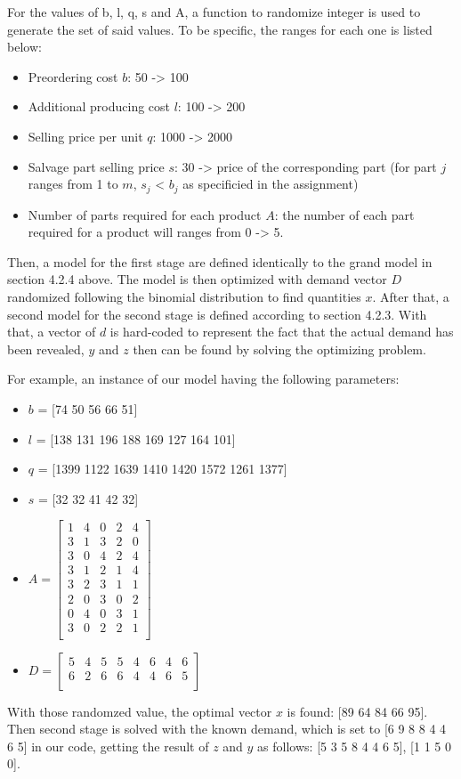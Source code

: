 		\qquad For the values of b, l, q, s and A, a function to randomize integer is used to generate the set of said values. To be specific, the ranges for each one is listed below:

		\begin{itemize}
			\item Preordering cost $b$: 50 -> 100
			\item Additional producing cost $l$: 100 -> 200
			\item Selling price per unit $q$: 1000 -> 2000
			\item Salvage part selling price $s$: 30 -> price of the corresponding part (for part $j$ ranges from 1 to $m$, $s_j$ < $b_j$ as specificied in the assignment)
			\item Number of parts required for each product $A$: the number of each part required for a product will ranges from 0 -> 5.
		\end{itemize}

		\qquad Then, a model for the first stage are defined identically to the grand model in section 4.2.4 above. The model is then optimized with demand vector $D$ randomized following the binomial distribution to find quantities $x$. After that, a second model for the second stage is defined according to section 4.2.3. With that, a vector of $d$ is hard-coded to represent the fact that the actual demand has been revealed, $y$ and $z$ then can be found by solving the optimizing problem.

		\qquad For example, an instance of our model having the following parameters:

		\begin{itemize}
			\item $b$ = [74 50 56 66 51]
			\item $l$ = [138 131 196 188 169 127 164 101]
			\item $q$ = [1399 1122 1639 1410 1420 1572 1261 1377]
			\item $s$ = [32 32 41 42 32]
			\item $A = 	\begin{bmatrix}
							1 & 4 & 0 & 2 & 4 \\
							3 & 1 & 3 & 2 & 0 \\
							3 & 0 & 4 & 2 & 4 \\
							3 & 1 & 2 & 1 & 4 \\
							3 & 2 & 3 & 1 & 1 \\
							2 & 0 & 3 & 0 & 2 \\
							0 & 4 & 0 & 3 & 1 \\
							3 & 0 & 2 & 2 & 1 \\
						\end{bmatrix}$
			\item $D = 	\begin{bmatrix}
							5 & 4 & 5 & 5 & 4 & 6 & 4 & 6 \\
							6 & 2 & 6 & 6 & 4 & 4 & 6 & 5 \\
						\end{bmatrix}$
		\end{itemize}

		\qquad With those randomzed value, the optimal vector $x$ is found: [89 64 84 66 95]. Then second stage is solved with the known demand, which is set to [6 9 8 8 4 4 6 5] in our code, getting the result of $z$ and $y$ as follows: [5 3 5 8 4 4 6 5], [1 1 5 0 0].
